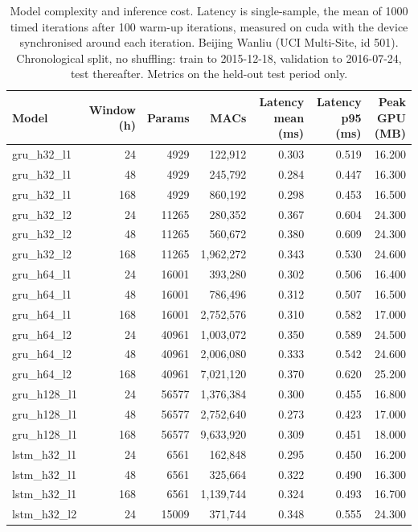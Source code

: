 \begin{table}[htbp]
\caption{Model complexity and inference cost. Latency is single-sample, the mean of 1000 timed iterations after 100 warm-up iterations, measured on cuda with the device synchronised around each iteration. Beijing Wanliu (UCI Multi-Site, id 501). Chronological split, no shuffling: train to 2015-12-18, validation to 2016-07-24, test thereafter. Metrics on the held-out test period only.}
\label{tab:green_complexity}
\begin{tabular}{lrrrrrr}
\toprule
Model & Window (h) & Params & MACs & Latency mean (ms) & Latency p95 (ms) & Peak GPU (MB) \\
\midrule
gru\_h32\_l1 & 24 & 4929 & 122,912 & 0.303 & 0.519 & 16.200 \\
gru\_h32\_l1 & 48 & 4929 & 245,792 & 0.284 & 0.447 & 16.300 \\
gru\_h32\_l1 & 168 & 4929 & 860,192 & 0.298 & 0.453 & 16.500 \\
gru\_h32\_l2 & 24 & 11265 & 280,352 & 0.367 & 0.604 & 24.300 \\
gru\_h32\_l2 & 48 & 11265 & 560,672 & 0.380 & 0.609 & 24.300 \\
gru\_h32\_l2 & 168 & 11265 & 1,962,272 & 0.343 & 0.530 & 24.600 \\
gru\_h64\_l1 & 24 & 16001 & 393,280 & 0.302 & 0.506 & 16.400 \\
gru\_h64\_l1 & 48 & 16001 & 786,496 & 0.312 & 0.507 & 16.500 \\
gru\_h64\_l1 & 168 & 16001 & 2,752,576 & 0.310 & 0.582 & 17.000 \\
gru\_h64\_l2 & 24 & 40961 & 1,003,072 & 0.350 & 0.589 & 24.500 \\
gru\_h64\_l2 & 48 & 40961 & 2,006,080 & 0.333 & 0.542 & 24.600 \\
gru\_h64\_l2 & 168 & 40961 & 7,021,120 & 0.370 & 0.620 & 25.200 \\
gru\_h128\_l1 & 24 & 56577 & 1,376,384 & 0.300 & 0.455 & 16.800 \\
gru\_h128\_l1 & 48 & 56577 & 2,752,640 & 0.273 & 0.423 & 17.000 \\
gru\_h128\_l1 & 168 & 56577 & 9,633,920 & 0.309 & 0.451 & 18.000 \\
lstm\_h32\_l1 & 24 & 6561 & 162,848 & 0.295 & 0.450 & 16.200 \\
lstm\_h32\_l1 & 48 & 6561 & 325,664 & 0.322 & 0.490 & 16.300 \\
lstm\_h32\_l1 & 168 & 6561 & 1,139,744 & 0.324 & 0.493 & 16.700 \\
lstm\_h32\_l2 & 24 & 15009 & 371,744 & 0.348 & 0.555 & 24.300 \\

\end{tabular}
\end{table}
